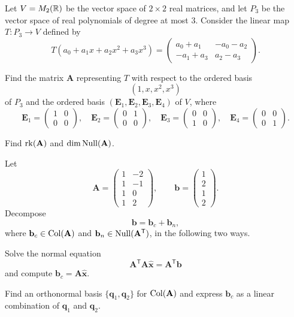 \documentclass[11pt,oneside]{article}
\begin{document}
\begin{problem}
Let $V=M_2(\mathbb{R})$ be the vector space of $2\times2$ real matrices, and let $P_3$ be the vector space of real polynomials of degree at most $3$. Consider the linear map $T\colon P_3\to V$ defined by
\[
T(a_0+a_1x+a_2x^2+a_3x^3)
=
\begin{pmatrix}
a_0+a_1&-a_0-a_2\\
-a_1+a_3&a_2-a_3
\end{pmatrix}.
\]
\begin{problemsubparts}
\item Find the matrix $\mathbf A$ representing $T$ with respect to the ordered basis
\[
(1,x,x^2,x^3)
\]
of $P_3$ and the ordered basis $(\mathbf E_1,\mathbf E_2,\mathbf E_3,\mathbf E_4)$ of $V$, where
\[
\mathbf E_1=
\begin{pmatrix}1&0\\0&0\end{pmatrix},\quad
\mathbf E_2=
\begin{pmatrix}0&1\\0&0\end{pmatrix},\quad
\mathbf E_3=
\begin{pmatrix}0&0\\1&0\end{pmatrix},\quad
\mathbf E_4=
\begin{pmatrix}0&0\\0&1\end{pmatrix}.
\]
\item Find $\operatorname{rk}(\mathbf A)$ and $\dim\operatorname{Null}(\mathbf A)$.
\end{problemsubparts}
\end{problem}

\begin{problem}
Let
\[
\mathbf A=
\begin{pmatrix}
1&-2\\
1&-1\\
1&0\\
1&2
\end{pmatrix},
\qquad
\mathbf b=
\begin{pmatrix}
1\\2\\1\\2
\end{pmatrix}.
\]
Decompose
\[
\mathbf b=\mathbf b_c+\mathbf b_n,
\]
where $\mathbf b_c\in\operatorname{Col}(\mathbf A)$ and $\mathbf b_n\in\operatorname{Null}(\mathbf A^{\mathsf T})$, in the following two ways.
\begin{problemsubparts}
\item Solve the normal equation
\[
\mathbf A^{\mathsf T}\mathbf A\widehat{\mathbf x}=\mathbf A^{\mathsf T}\mathbf b
\]
and compute $\mathbf b_c=\mathbf A\widehat{\mathbf x}$.
\item Find an orthonormal basis $\{\mathbf q_1,\mathbf q_2\}$ for $\operatorname{Col}(\mathbf A)$ and express $\mathbf b_c$ as a linear combination of $\mathbf q_1$ and $\mathbf q_2$.
\end{problemsubparts}
\end{problem}
\end{document}
